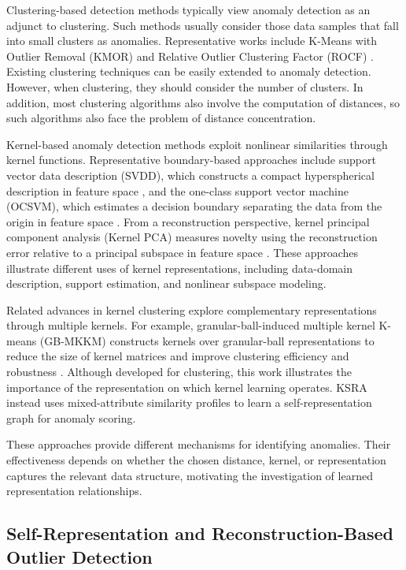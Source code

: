 \documentclass[ASNA,twocolumn]{USG} %
\begin{document}
Clustering-based detection methods typically view anomaly detection as an adjunct to clustering. Such methods usually consider those data samples that fall into small clusters as anomalies. Representative works include K-Means with Outlier Removal (KMOR) \cite{gan2017k} and Relative Outlier Clustering Factor (ROCF) \cite{huang2017novel}. Existing clustering techniques can be easily extended to anomaly detection. However, when clustering, they should consider the number of clusters. In addition, most clustering algorithms also involve the computation of distances, so such algorithms also face the problem of distance concentration.

Kernel-based anomaly detection methods exploit nonlinear similarities through kernel functions. Representative boundary-based approaches include support vector data description (SVDD), which constructs a compact hyperspherical description in feature space \cite{tax2004support}, and the one-class support vector machine (OCSVM), which estimates a decision boundary separating the data from the origin in feature space \cite{scholkopf2001estimating}. From a reconstruction perspective, kernel principal component analysis (Kernel PCA) measures novelty using the reconstruction error relative to a principal subspace in feature space \cite{hoffmann2007kernel}. These approaches illustrate different uses of kernel representations, including data-domain description, support estimation, and nonlinear subspace modeling.

Related advances in kernel clustering explore complementary representations through multiple kernels. For example, granular-ball-induced multiple kernel K-means (GB-MKKM) constructs kernels over granular-ball representations to reduce the size of kernel matrices and improve clustering efficiency and robustness \cite{xia2025granular}. Although developed for clustering, this work illustrates the importance of the representation on which kernel learning operates. KSRA instead uses mixed-attribute similarity profiles to learn a self-representation graph for anomaly scoring.

These approaches provide different mechanisms for identifying anomalies. Their effectiveness depends on whether the chosen distance, kernel, or representation captures the relevant data structure, motivating the investigation of learned representation relationships.

\subsection{Self-Representation and Reconstruction-Based Outlier Detection}
\end{document}
